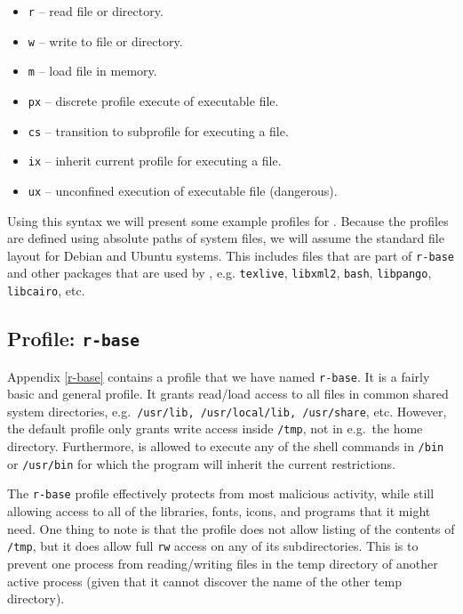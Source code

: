 \begin{itemize}
  \item[] \texttt{r} -- read file or directory.
  \item[] \texttt{w} -- write to file or directory.
  \item[] \texttt{m} -- load file in memory.
  \item[] \texttt{px} -- discrete profile execute of executable file.
  \item[] \texttt{cs} -- transition to subprofile for executing a file.
  \item[] \texttt{ix} -- inherit current profile for executing a file.
  \item[] \texttt{ux} -- unconfined execution of executable file (dangerous).
\end{itemize}

Using this syntax we will present some example profiles for \R. Because the
profiles are defined using absolute paths of system files, we will assume the
standard file layout for Debian and Ubuntu systems. This includes files that
are part of \texttt{r-base} and other packages that are used by \R, e.g.
\texttt{texlive}, \texttt{libxml2}, \texttt{bash}, \texttt{libpango},
\texttt{libcairo}, etc.

\subsection{Profile: \texttt{r-base}}
\label{r-base-intro}

Appendix \ref{r-base} contains a profile that we have named \texttt{r-base}.
It is a fairly basic and general profile. It grants read/load access to all
files in common shared system directories, e.g.\ \texttt{/usr/lib,
/usr/local/lib, /usr/share}, etc. However, the default profile only grants
write access inside \texttt{/tmp}, not in e.g.\ the home directory. Furthermore,
\R is allowed to execute any of the shell commands in \texttt{/bin}
or \texttt{/usr/bin} for which the program will inherit the current
restrictions.



The \texttt{r-base} profile effectively protects \R from most malicious
activity, while still allowing access to all of the libraries, fonts, icons,
and programs that it might need. One thing to note is that the profile does not
allow listing of the contents of \texttt{/tmp}, but it does allow full
\texttt{rw} access on any of its subdirectories. This is to prevent one process
from reading/writing files in the temp directory of another active \R process
(given that it cannot discover the name of the other temp directory).

